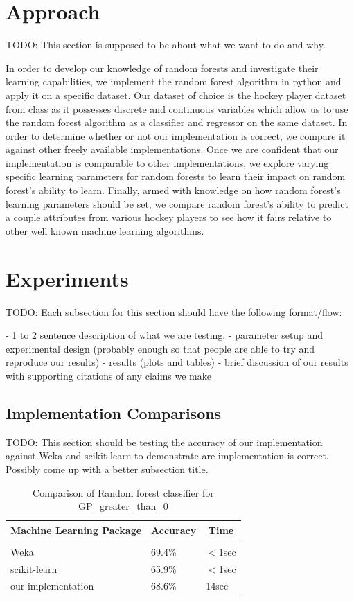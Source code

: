 \documentclass{article} %
\begin{document}
\section{Approach}

TODO: This section is supposed to be about what we want to do and why.

In order to develop our knowledge of random forests and investigate their learning capabilities, we implement the random forest algorithm in python and apply it on a specific dataset.  Our dataset of choice is the hockey player dataset from class as it possesses discrete and continuous variables which allow us to use the random forest algorithm as a classifier and regressor on the same dataset.  In order to determine whether or not our implementation is correct, we compare it against other freely available implementations.  Once we are confident that our implementation is comparable to other implementations, we explore varying specific learning parameters for random forests to learn their impact on random forest's ability to learn.  Finally, armed with knowledge on how random forest's learning parameters should be set, we compare random forest's ability to predict a couple attributes from various hockey players to see how it fairs relative to other well known machine learning algorithms.


\section{Experiments}
TODO: Each subsection for this section should have the following format/flow:

- 1 to 2 sentence description of what we are testing.
- parameter setup and experimental design (probably enough so that people are able to try and reproduce our results)
- results (plots and tables)
- brief discussion of our results with supporting citations of any claims we make

\subsection{Implementation Comparisons}
TODO: This section should be testing the accuracy of our implementation against Weka and scikit-learn to demonstrate are implementation is correct.  Possibly come up with a better subsection title.

\begin{table}[h]
\caption{Comparison of Random forest classifier for GP\_greater\_than\_0}
\label{clas-table}
\begin{center}
\begin{tabular}{lll}
\multicolumn{1}{c}{\bf Machine Learning Package} &\multicolumn{1}{c}{\bf Accuracy} &\multicolumn{1}{c}{\bf Time}
\\ \hline \\
Weka         &69.4\%	&$<$1sec \\
scikit-learn             &65.9\%	&$<$1sec \\
our implementation             &68.6\%	&14sec \\
\end{tabular}
\end{center}
\end{table}
\end{document}
